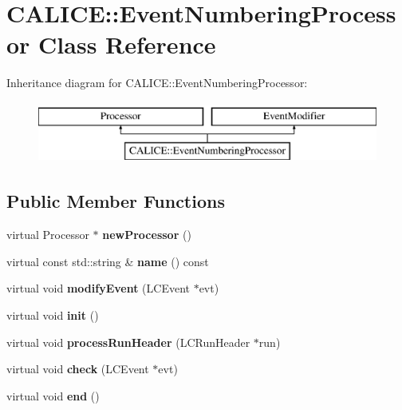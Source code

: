 \section{C\-A\-L\-I\-C\-E\-:\-:Event\-Numbering\-Processor Class Reference}
\label{classCALICE_1_1EventNumberingProcessor}
Inheritance diagram for C\-A\-L\-I\-C\-E\-:\-:Event\-Numbering\-Processor\-:\begin{figure}[H]
\begin{center}
\leavevmode
\includegraphics[height=2.000000cm]{classCALICE_1_1EventNumberingProcessor}
\end{center}
\end{figure}
\subsection*{Public Member Functions}
\begin{DoxyCompactItemize}
\item 
virtual Processor $\ast$ {\bfseries new\-Processor} ()\label{classCALICE_1_1EventNumberingProcessor_a38e5409171785827ce12503947b08f5e}

\item 
virtual const std\-::string \& {\bfseries name} () const \label{classCALICE_1_1EventNumberingProcessor_ad8c2e530a6e0a5540d642116145cb512}

\item 
virtual void {\bfseries modify\-Event} (L\-C\-Event $\ast$evt)\label{classCALICE_1_1EventNumberingProcessor_afae9d8d083141ce67dff5c46136b96e7}

\item 
virtual void {\bfseries init} ()\label{classCALICE_1_1EventNumberingProcessor_a9de7055f49f0fa959bad3f5eaf0af4e2}

\item 
virtual void {\bfseries process\-Run\-Header} (L\-C\-Run\-Header $\ast$run)\label{classCALICE_1_1EventNumberingProcessor_ad440173c4d8ba8569360e822f645ba98}

\item 
virtual void {\bfseries check} (L\-C\-Event $\ast$evt)\label{classCALICE_1_1EventNumberingProcessor_a5f2c6d236e6fb61a823c879db688d4e3}

\item 
virtual void {\bfseries end} ()\label{classCALICE_1_1EventNumberingProcessor_a3a59bda8669f25327cf20f4ceda8cc54}

\end{DoxyCompactItemize}


